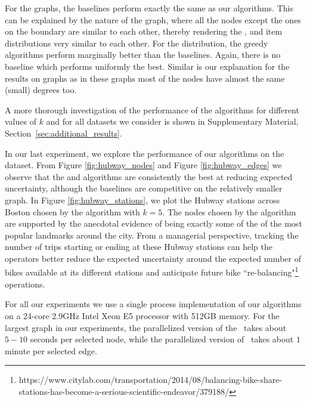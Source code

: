 For the {\grid} graphs, the baselines perform exactly
the same as our algorithms. This can be explained by the nature of the 
{\grid} graph, where all the nodes except the ones on the boundary are similar to each other,
thereby rendering the {\direct}, {\uniform} and {\inverse} item distributions very similar 
to each other. For the {\ego} distribution, the greedy algorithms perform marginally better
than the baselines.
Again,
there is no baseline which performs uniformly the best.
Similar is our explanation for the results on {\ba} graphs as in these graphs most of the nodes have
almost the same (small) degrees too.

A more thorough investigation of the performance of the algorithms for different
values of $k$ and for all datasets we consider is shown in 
Supplementary Material, Section~\ref{sec:additional_results}.





In our last experiment, 
we explore the performance of our algorithms on the {\hubway} dataset. From Figure \ref{fig:hubway_nodes}
and Figure \ref{fig:hubway_edges} we observe that the {\nodegreedy} and {\edgegreedy} algorithms
are consistently the best at reducing expected uncertainty, although the baselines are competitive on the
relatively smaller graph. In Figure \ref{fig:hubway_stations}, we plot the Hubway stations across Boston
chosen by the {\nodegreedy} algorithm with $k=5$. The nodes chosen by the algorithm are supported by
the anecdotal evidence of being exactly some of the of the most popular landmarks around the city.
From a managerial perspective, tracking the number of trips starting or ending at these Hubway stations
can help the operators better reduce the expected uncertainty around the expected number of bikes
available at its different stations and anticipate future bike ``re-balancing"\footnote{https://www.citylab.com/transportation/2014/08/balancing-bike-share-stations-has-become-a-serious-scientific-endeavor/379188/} operations.

 For all our experiments we use a single process 
implementation of our algorithms on a 24-core 2.9GHz Intel Xeon E5 processor 
with 512GB memory. For the  largest graph in our experiments,  
the parallelized version of the {\nodegreedy}\ takes about $5-10$ 
seconds per selected node, while the parallelized version of {\edgegreedy}\ 
takes about $1$ minute per selected edge.

